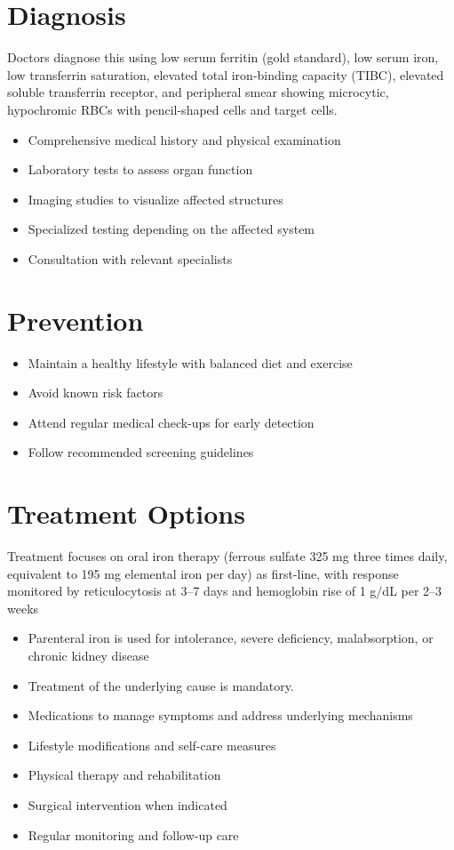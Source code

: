 \section{Diagnosis}
Doctors diagnose this using low serum ferritin (gold standard), low serum iron, low transferrin saturation, elevated total iron-binding capacity (TIBC), elevated soluble transferrin receptor, and peripheral smear showing microcytic, hypochromic RBCs with pencil-shaped cells and target cells.

\begin{itemize}[noitemsep]
  \item Comprehensive medical history and physical examination
  \item Laboratory tests to assess organ function
  \item Imaging studies to visualize affected structures
  \item Specialized testing depending on the affected system
  \item Consultation with relevant specialists
\end{itemize}
\section{Prevention}
\begin{itemize}[noitemsep]
  \item Maintain a healthy lifestyle with balanced diet and exercise
  \item Avoid known risk factors
  \item Attend regular medical check-ups for early detection
  \item Follow recommended screening guidelines
\end{itemize}
\section{Treatment Options}
Treatment focuses on oral iron therapy (ferrous sulfate 325 mg three times daily, equivalent to 195 mg elemental iron per day) as first-line, with response monitored by reticulocytosis at 3--7 days and hemoglobin rise of 1 g/dL per 2--3 weeks

\begin{itemize}[noitemsep]
  \item Parenteral iron is used for intolerance, severe deficiency, malabsorption, or chronic kidney disease
  \item Treatment of the underlying cause is mandatory.
  \item Medications to manage symptoms and address underlying mechanisms
  \item Lifestyle modifications and self-care measures
  \item Physical therapy and rehabilitation
  \item Surgical intervention when indicated
  \item Regular monitoring and follow-up care
\end{itemize}
